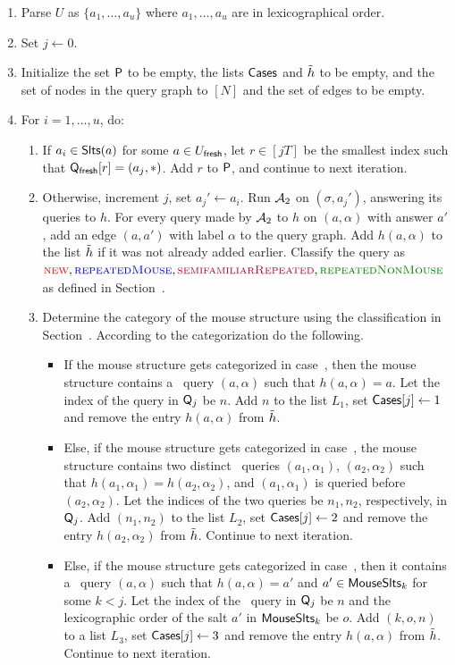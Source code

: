 \begin{enumerate}
  \item Parse $U$ as $\{a_1,\ldots,a_u\}$ where $a_1,\ldots,a_u$ are in lexicographical order.
  \item Set $j\gets 0$.
  \item Initialize the set $\mathsf{P}$ to be empty, the lists $\mathsf{Cases}$ and $\tilde{h}$ to be empty, and the set of nodes in the query graph to $[N]$ and the set of edges to be empty. 
  \item For $i=1,\ldots,u$, do:
  \begin{enumerate}
  \item If $a_i\in \mathsf{Slts}(a)$ for some $a\in U_\textsf{fresh}$, let $r\in [jT]$ be the smallest index such that $\mathsf{Q}_\textsf{fresh}[r]=(a_j,\ast)$. Add $r$ to $\mathsf{P}$, and continue to next iteration.
  \item Otherwise, increment $j$, set $a_j'\gets a_i$. Run $\mathcal{A}_2$ on $(\sigma,a_j')$, answering its queries to $h$. For every query made by $\mathcal{A}_2$ to $h$ on $(a,\alpha)$ with answer $a'$, add an edge $(a,a')$ with label $\alpha$ to the query graph. Add $h(a,\alpha)$ to the list $\tilde{h}$ if it was not already added earlier. Classify the query as $\new,\frep,\sfrep,\urep$ as defined in Section~.
  \item Determine the category of the mouse structure using the classification in Section~. According to the categorization do the following.
  \begin{itemize}
  \item If the mouse structure gets categorized in case~, then the mouse structure contains a \new\ query $(a,\alpha)$ such that $h(a,\alpha)=a$. Let the index of the query in $\mathsf{Q}_j$ be $n$. Add $n$ to the list $L_1$, set $\mathsf{Cases}[j]\gets 1$ and remove the entry $h(a,\alpha)$ from $\tilde{h}$.  
  \item Else, if the mouse structure gets categorized  in case~, the mouse structure contains two distinct \new\ queries $(a_1,\alpha_1)$, $(a_2,\alpha_2)$ such that $h(a_1,\alpha_1)=h(a_2,\alpha_2)$, and $(a_1,\alpha_1)$ is queried before $(a_2,\alpha_2)$. Let the indices of the two queries be $n_1,n_2$, respectively, in $\mathsf{Q}_j$. Add $(n_1,n_2)$ to the list $L_2$, set $\mathsf{Cases}[j]\gets 2$ and remove the entry $h(a_2,\alpha_2)$ from $\tilde{h}$. Continue to next iteration.
  \item Else, if the mouse structure gets categorized  in case~, then it contains a \new\ query $(a,\alpha)$ such that $h(a,\alpha)=a'$ and $a'\in \mathsf{MouseSlts}_k$ for some $k<j$. Let the index of the \new\ query in $\mathsf{Q}_j$ be $n$ and the lexicographic order of the salt $a'$ in $\mathsf{MouseSlts}_k$ be $o$. Add $(k,o,n)$ to a list $L_3$, set $\mathsf{Cases}[j]\gets 3$  and remove the entry $h(a,\alpha)$ from $\tilde{h}$. Continue to next iteration.

\end{itemize}
\end{enumerate}
\end{enumerate}
